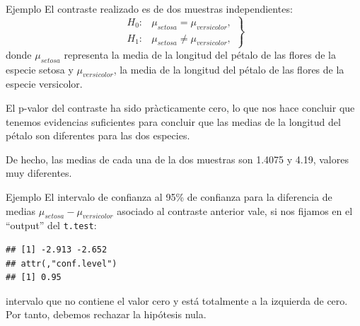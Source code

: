 \documentclass[
  ignorenonframetext,
]{beamer}
\newenvironment{Shaded}{\begin{snugshade}}{\end{snugshade}}
\newcommand{\DataTypeTok}[1]{\textcolor[rgb]{0.13,0.29,0.53}{#1}}
\newcommand{\KeywordTok}[1]{\textcolor[rgb]{0.13,0.29,0.53}{\textbf{#1}}}
\newcommand{\NormalTok}[1]{#1}
\newcommand{\OperatorTok}[1]{\textcolor[rgb]{0.81,0.36,0.00}{\textbf{#1}}}
\newcommand{\StringTok}[1]{\textcolor[rgb]{0.31,0.60,0.02}{#1}}
\begin{document}
\begin{frame}{Ejemplo}
\protect\hypertarget{ejemplo-32}{}
El contraste realizado es de dos muestras independientes: \[
\left.
\begin{array}{ll}
H_0: & \mu_{{setosa}} =\mu_{{versicolor}}, \\
H_1: & \mu_{{setosa}} \neq \mu_{{versicolor}},
\end{array}
\right\}
\] donde \(\mu_{{setosa}}\) representa la media de la longitud del
pétalo de las flores de la especie setosa y \(\mu_{{versicolor}}\), la
media de la longitud del pétalo de las flores de la especie versicolor.

El p-valor del contraste ha sido pràcticamente cero, lo que nos hace
concluir que tenemos evidencias suficientes para concluir que las medias
de la longitud del pétalo son diferentes para las dos especies.

De hecho, las medias de cada una de la dos muestras son 1.4075 y 4.19,
valores muy diferentes.
\end{frame}

\begin{frame}[fragile]{Ejemplo}
\protect\hypertarget{ejemplo-33}{}
El intervalo de confianza al 95\% de confianza para la diferencia de
medias \(\mu_{{setosa}}-\mu_{{versicolor}}\) asociado al contraste
anterior vale, si nos fijamos en el ``output'' del \texttt{t.test}:

\begin{Shaded}
\end{Shaded}

\begin{verbatim}
## [1] -2.913 -2.652
## attr(,"conf.level")
## [1] 0.95
\end{verbatim}

intervalo que no contiene el valor cero y está totalmente a la izquierda
de cero. Por tanto, debemos rechazar la hipótesis nula.
\end{frame}
\end{document}
